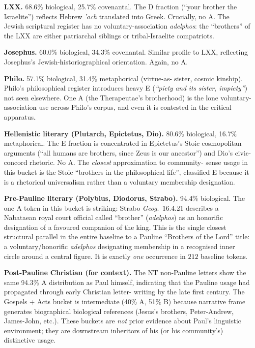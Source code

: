 \documentclass[11pt,oneside]{article}
\begin{document}
\textbf{LXX.}  68.6\% biological, 25.7\% covenantal.  The D fraction
(\enquote{your brother the Israelite}) reflects Hebrew \textit{'ach}
translated into Greek.  Crucially, no A.  The Jewish scriptural
register has no voluntary-association \textit{adelphos}: the
\enquote{brothers} of the LXX are either patriarchal siblings or
tribal-Israelite compatriots.

\textbf{Josephus.}  60.0\% biological, 34.3\% covenantal.  Similar
profile to LXX, reflecting Josephus's Jewish-historiographical
orientation.  Again, no A.

\textbf{Philo.}  57.1\% biological, 31.4\% metaphorical (virtue-as-
sister, cosmic kinship).  Philo's philosophical register introduces
heavy E (\textit{\enquote{piety and its sister, impiety}}) not seen
elsewhere.  One A (the Therapeutae's brotherhood) is the lone
voluntary-association use across Philo's corpus, and even it is
contested in the critical apparatus.

\textbf{Hellenistic literary (Plutarch, Epictetus, Dio).}  80.6\%
biological, 16.7\% metaphorical.  The E fraction is concentrated in
Epictetus's Stoic cosmopolitan arguments (\enquote{all humans are
brothers, since Zeus is our ancestor}) and Dio's civic-concord
rhetoric.  No A.  The \textit{closest} approximation to community-
sense usage in this bucket is the Stoic \enquote{brothers in the
philosophical life}, classified E because it is a rhetorical
universalism rather than a voluntary membership designation.

\textbf{Pre-Pauline literary (Polybius, Diodorus, Strabo).}  94.4\%
biological.  The one A token in this bucket is striking: Strabo
\textit{Geog.}\ 16.4.21 describes a Nabataean royal court official
called \enquote{brother} (\textit{adelphos}) as an honorific
designation of a favoured companion of the king.  This is the single
closest structural parallel in the entire baseline to a Pauline
\enquote{Brothers of the Lord} title: a voluntary/honorific
\textit{adelphos} designating membership in a recognised inner circle
around a central figure.  It is exactly \textit{one} occurrence in
$212$ baseline tokens.

\textbf{Post-Pauline Christian (for context).}  The NT non-Pauline
letters show the same 94.3\% A distribution as Paul himself, indicating
that the Pauline usage had propagated through early Christian letter-
writing by the late first century.  The Gospels + Acts bucket is
intermediate (40\% A, 51\% B) because narrative frame generates
biographical biological references (Jesus's brothers, Peter-Andrew,
James-John, etc.).  These buckets are \textit{not} prior evidence about
Paul's linguistic environment; they are downstream inheritors of his
(or his community's) distinctive usage.
\end{document}
